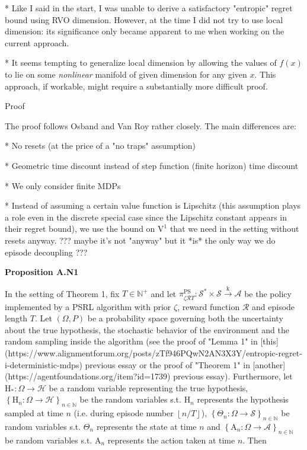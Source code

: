 \documentclass[a4paper]{article}
\newcommand{\Co}[1]{}
\newcommand{\AC}[1]{\left\{#1\right\}}
\newcommand{\Nats}{\mathbb{N}}
\newcommand{\Floor}[1]{\left\lfloor #1 \right\rfloor}
\newcommand{\K}{\xrightarrow{\mathrm{k}}}
\newcommand{\St}{\mathcal{S}}
\newcommand{\A}{\mathcal{A}}
\newcommand{\R}{\mathcal{R}}
\newcommand{\Hy}{\mathcal{H}}
\newcommand{\V}{\mathrm{V}}
\newcommand{\PSR}{\text{PS}}
\newcommand{\AT}{\mathrm{A}}
\newcommand{\THy}{\mathrm{H}_*}
\newcommand{\SHy}{\mathrm{H}}
\begin{document}
* Like I said in the start, I was unable to derive a satisfactory "entropic" regret bound using RVO dimension. However, at the time I did not try to use local dimension: its significance only became apparent to me when working on the current approach.

* It seems tempting to generalize local dimension by allowing the values of $f(x)$ to lie on some \textit{nonlinear} manifold of given dimension for any given $x$. This approach, if workable, might require a substantially more difficult proof.

\begin{Huge}Proof\end{Huge}

The proof follows Osband and Van Roy rather closely. The main differences are:

* No resets (at the price of a "no traps" assumption)

* Geometric time discount instead of step function (finite horizon) time discount

* We only consider finite MDPs

* Instead of assuming a certain value function is Lipschitz (this assumption plays a role even in the discrete special case since the Lipschitz constant appears in their regret bound), we use the bound on $\V^1$ that we need in the setting without resets anyway. ??? maybe it's not "anyway" but it *is* the only way we do episode decoupling ???

\textbf{Proposition A.N1}\Co{b}

In the setting of Theorem 1, fix $T\in\Nats^+$ and let $\pi_{\zeta\R T}^{\PSR}: \St^*\times\St\K\A$ be the policy implemented by a PSRL algorithm with prior $\zeta$, reward function $\R$ and episode length $T$. Let $(\Omega,P)$ be a probability space governing both the uncertainty about the true hypothesis, the stochastic behavior of the environment and the random sampling inside the algorithm (see the proof of "Lemma 1" in [this](https://www.alignmentforum.org/posts/zTf946PQwN2AN3X3Y/entropic-regret-i-deterministic-mdps) previous essay or the proof of "Theorem 1" in [another](https://agentfoundations.org/item?id=1739) previous essay). Furthermore, let $\THy:\Omega\rightarrow\Hy$ be a random variable representing the true hypothesis, $\AC{\SHy_n:\Omega\rightarrow\Hy}_{n\in\Nats}$ be the random variables s.t. $\SHy_n$ represents the hypothesis sampled at time $n$ (i.e. during episode number $\Floor{n/T}$), $\AC{\Theta_n:\Omega\rightarrow\St}_{n\in\Nats}$ be random variables s.t. $\Theta_n$ represents the state at time $n$ and $\AC{\AT_n:\Omega\rightarrow\A}_{n\in\Nats}$ be random variables s.t. $\AT_n$ represents the action taken at time $n$. Then
\end{document}
